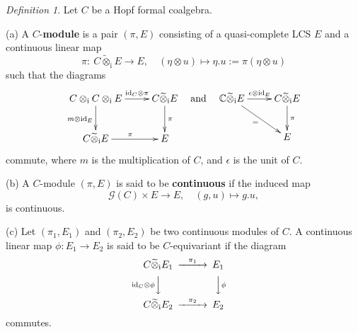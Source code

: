 \documentclass[12pt, a4paper]{amsart}
\newcommand{\BC}{{\mathbb {C}}}
\newcommand{\CG}{{\mathcal {G}}}
\newcommand{\CO}{{\mathcal {O}}}
\newcommand{\Ri}{{\mathrm{i}}}
\newcommand{\wt}{\widetilde}
\newcommand{\wh}{\widehat}
\newcommand{\be}{\begin {equation}}
\newcommand{\ee}{\end {equation}}
\newcommand{\qaq}{\quad\textrm{and}\quad}
\renewcommand{\mid}{\,:\,}
\theoremstyle{Theorem}
\theoremstyle{Theorem}
\theoremstyle{Theorem}
\theoremstyle{Theorem}
\theoremstyle{Plain}
\theoremstyle{remark}
\theoremstyle{remark}
\theoremstyle{Definition}
\newtheorem{dfn}{Definition}[section]
\numberwithin{equation}{section}
\begin{document}


\begin{dfn}\label{def:Cmod}
Let $C$ be a  Hopf formal coalgebra.

\noindent(a) A $C$-\textbf{module} is a pair $(\pi,E)$
consisting of a quasi-complete LCS $E$ and a continuous linear map
\[\pi:\  C\wt\otimes_{\mathrm{i}} E\rightarrow E,\quad (\eta\otimes u)\mapsto \eta.u:=\pi(\eta\otimes u)\] 
such that the diagrams
\be\label{eq:RepchianruleofD}
 \xymatrix{ C\otimes_{\Ri} C\otimes_{\Ri} E \ar[r]^-{\mathrm{id}_{C}\otimes \pi} \ar[d]_{m\otimes \mathrm{id}_E} & C\wt\otimes_{\Ri} E \ar[d]^{\pi} \\ C\wt\otimes_{\Ri} E \ar[r]^{\pi} & E } \qaq \xymatrix{\BC\wt\otimes_\Ri E\ar[r]^{\epsilon\otimes \mathrm{id}_E}\ar[rd]_{=} & C\wt\otimes_{\Ri} E\ar[d]^{\pi} \\ & E}\ee commute,  where $m$ is the multiplication of $C$, and $\epsilon$ is the unit of $C$. 

\noindent (b)
A $C$-module $(\pi,E)$ is said to be \textbf{continuous} if the induced map 
\[ \CG(C)\times E\rightarrow E,\quad (g,u)\mapsto g.u,\]  is continuous. 

\noindent (c) Let $(\pi_1, E_1)$ and $(\pi_2, E_2)$ be two continuous modules of $C$.
    A continuous linear map $\phi: E_1\rightarrow E_2$ is said to be  $C$-equivariant if the diagram 
    \[\begin{CD}
        C\wt\otimes_{\mathrm{i}} E_1 @>\pi_1>> E_1\\ @V\mathrm{id}_{C}\otimes\phi VV @VV\phi V \\ C\wt\otimes_{\mathrm{i}} E_2@>\pi_2>> E_2
    \end{CD}\]
    commutes.
\end{dfn}
\end{document}
